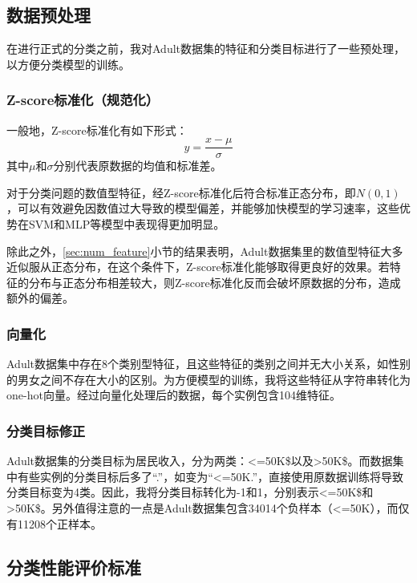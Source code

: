\documentclass[12pt,a4paper]{article}
\theoremstyle{definition}
\begin{document}
\subsection{数据预处理}

在进行正式的分类之前，我对Adult数据集的特征和分类目标进行了一些预处理，以方便分类模型的训练。

\subsubsection{Z-score标准化（规范化）}

一般地，Z-score标准化有如下形式：
\begin{equation}
	y = \dfrac{x - \mu}{\sigma}
\end{equation}
其中$\mu$和$\sigma$分别代表原数据的均值和标准差。

\vspace{0.01\linewidth}
对于分类问题的数值型特征，经Z-score标准化后符合标准正态分布，即$N(0, 1)$，可以有效避免因数值过大导致的模型偏差，并能够加快模型的学习速率，这些优势在SVM和MLP等模型中表现得更加明显。

\vspace{0.01\linewidth}
除此之外，\ref{sec:num_feature}小节的结果表明，Adult数据集里的数值型特征大多近似服从正态分布，在这个条件下，Z-score标准化能够取得更良好的效果。若特征的分布与正态分布相差较大，则Z-score标准化反而会破坏原数据的分布，造成额外的偏差。

\subsubsection{向量化}

Adult数据集中存在8个类别型特征，且这些特征的类别之间并无大小关系，如性别的男女之间不存在大小的区别。为方便模型的训练，我将这些特征从字符串转化为one-hot向量。经过向量化处理后的数据，每个实例包含104维特征。

\subsubsection{分类目标修正}
\label{sec:fix-target}

Adult数据集的分类目标为居民收入，分为两类：<=50K\$以及>50K\$。而数据集中有些实例的分类目标后多了“.”，如变为“<=50K.”，直接使用原数据训练将导致分类目标变为4类。因此，我将分类目标转化为-1和1，分别表示<=50K\$和>50K\$。另外值得注意的一点是Adult数据集包含34014个负样本（<=50K），而仅有11208个正样本。

\subsection{分类性能评价标准}
\end{document}
